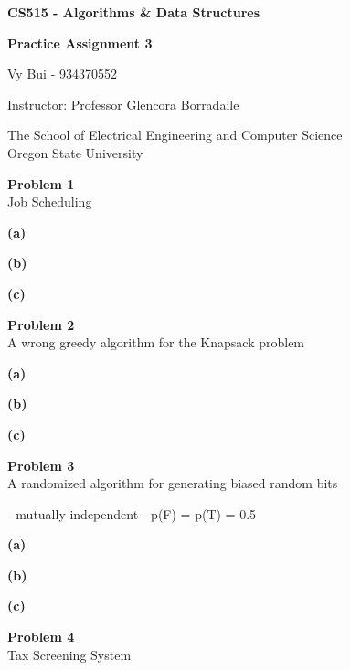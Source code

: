 \documentclass[12pt,article]{article}
\newcommand\projnumber{3}
\newenvironment{problem}[2][Problem]
    { \begin{mdframed}[backgroundcolor=gray!20] \textbf{#1 #2} \\}
    {  \end{mdframed}}
\begin{document}
\begin{titlepage}
    \begin{center}
        \vspace*{4cm}

        \textbf{\Large CS515 - Algorithms \& Data Structures}

        \vspace{0.5cm}
 
        \textbf{\Large Practice Assignment \projnumber}
 
        \vspace{1cm}

        Vy Bui - 934370552

        \vspace{2cm}

        Instructor: Professor Glencora Borradaile
        \vfill
             
        \vspace{0.8cm}
      
             
        The School of Electrical Engineering and Computer Science\\
        Oregon State University\\
             
    \end{center}
\end{titlepage}

\begin{problem}{1} 
Job Scheduling
\end{problem}

\textbf{(a)}

\textbf{(b)}

\textbf{(c)}

\newpage
\begin{problem}{2} 
A wrong greedy algorithm for the Knapsack problem 
\end{problem}

\textbf{(a)}

\textbf{(b)}

\textbf{(c)}

\newpage
\begin{problem}{3} 
A randomized algorithm for generating biased random bits
\end{problem}
- mutually independent
- p(F) = p(T) = 0.5



\textbf{(a)}

\textbf{(b)}

\textbf{(c)}

\newpage
\begin{problem}{4} 
Tax Screening System
\end{problem}



\end{document}
